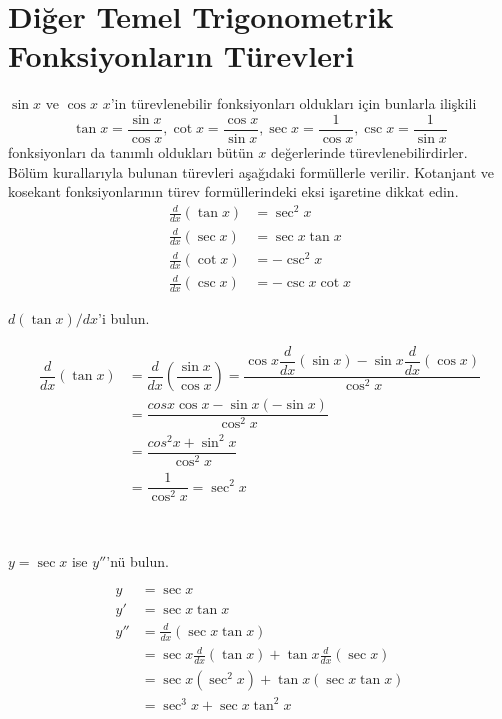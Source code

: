 \section{\protect Diğer Temel Trigonometrik Fonksiyonların Türevleri} \label{bolumetiketi}
$\sin x$ ve $\cos x$ $x$'in türevlenebilir fonksiyonları oldukları için bunlarla ilişkili
	\begin{equation*}
	\tan x =\frac{\sin x}{\cos x}, \cot x=\frac{\cos x}{\sin x}, \sec x =\frac{1}{\cos x}, \csc x=\frac{1}{\sin x}
	\end{equation*}
fonksiyonları da tanımlı oldukları bütün $x$ değerlerinde türevlenebilirdirler. Bölüm kurallarıyla bulunan türevleri aşağıdaki formüllerle verilir. Kotanjant ve kosekant fonksiyonlarının türev formüllerindeki eksi işaretine dikkat edin.
	\begin{equation*}
	\begin{split}
	\frac{d}{dx}(\tan x)&= \sec^2 x\\
	\frac{d}{dx}(\sec x)&= \sec x\tan x\\
	\frac{d}{dx}(\cot x)&= -\csc^2 x\\
	\frac{d}{dx}(\csc x)&=- \csc x\cot x
	\end{split}
	\end{equation*}

\begin{ornek}$d(\tan x)/dx$'i bulun.
\end{ornek}
\begin{cozum}
	\begin{equation*}
	\begin{split}
	\dfrac{d}{dx}\left( \tan x\right) &=\dfrac{d}{dx}\left( \dfrac{\sin x}{\cos x}\right) =\dfrac{\cos x\dfrac{d}{dx}\left( \sin x\right) -\sin x\dfrac{d}{dx}\left( \cos x\right) }{\cos ^{2}x}\\
	&=\dfrac{cosx\cos x-\sin x\left( -\sin x\right) }{\cos ^{2}x}\\
	&=\dfrac{cos^{2}x+\sin ^{2}x}{\cos ^{2}x}\\
	&=\dfrac{1}{\cos ^{2}x}=\sec ^{2}x
	\end{split}
	\end{equation*}
\end{cozum}
\\


\begin{ornek}$y=\sec x$ ise $y''$'nü bulun.
\end{ornek}
\begin{cozum}
	\begin{equation*}
	\begin{split}
	y&=\sec x\\
	y'&=\sec x \tan x \\
	y''&=\frac{d}{dx}(\sec x \tan x)\\
	&=\sec x\frac{d}{dx}(\tan x)+\tan x\frac{d}{dx}(\sec x)\\
	&=\sec x(\sec ^2 x)+\tan x(\sec x \tan x)\\
	&=\sec ^3 x + \sec x \tan ^2 x
	\end{split}
	\end{equation*}
\end{cozum}


